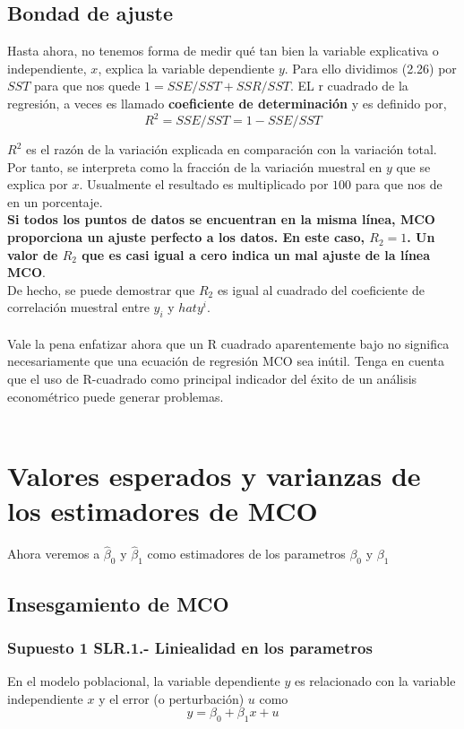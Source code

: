 \subsection{Bondad de ajuste}
Hasta ahora, no tenemos forma de medir qué tan bien la variable explicativa o independiente, $x$, explica la variable dependiente $y$. Para ello dividimos (2.26) por $SST$ para que nos quede $1=SSE/SST + SSR/SST$. EL r cuadrado de la regresión, a veces es llamado \textbf{coeficiente de determinación} y es definido por,
\begin{equation}
	R^2 = SSE/SST = 1 - SSE/SST
\end{equation}

$R^2$ es el razón de la variación explicada en comparación con la variación total. Por tanto, se interpreta como la fracción de la variación muestral en $y$ que se explica por $x$. Usualmente el resultado es multiplicado por $100$ para que nos de en un porcentaje.\\
\textbf{Si todos los puntos de datos se encuentran en la misma línea, MCO proporciona un ajuste perfecto a los datos. En este caso, $R_2 = 1$. Un valor de $R_2$ que es casi igual a cero indica un mal ajuste de la línea MCO}.\\
De hecho, se puede demostrar que $R_2$ es igual al cuadrado del coeficiente de correlación muestral entre $y_i$ y $hat{y}^i$.\\\\
Vale la pena enfatizar ahora que un R cuadrado aparentemente bajo no significa necesariamente que una ecuación de regresión MCO sea inútil. Tenga en cuenta que el uso de R-cuadrado como principal indicador del éxito de un análisis econométrico puede generar problemas.\\\\

\setcounter{section}{4}
\section{Valores esperados y varianzas de los estimadores de MCO}
Ahora veremos a $\hat{\beta}_0$ y $\hat{\beta}_1$ como estimadores de los parametros $\beta_0$ y $\beta_1$

\subsection{Insesgamiento de MCO}
\subsubsection{Supuesto 1 SLR.1.- Liniealidad en los parametros}
\begin{tcolorbox}[colframe=white]
    En el modelo poblacional, la variable dependiente $y$ es relacionado con la variable independiente $x$ y el error (o perturbación) $u$ como 
    \begin{equation}
	y = \beta_0 + \beta_1 x + u
    \end{equation}
\end{tcolorbox}

